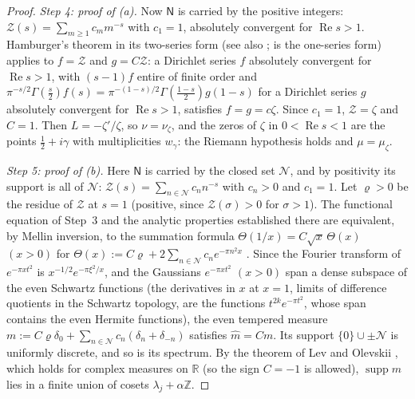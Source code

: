 \documentclass[11pt]{amsart}
\newcommand{\RR}{\mathbb R}
\newcommand{\ZZ}{\mathbb Z}
\renewcommand{\Re}{\operatorname{Re}}
\newcommand{\supp}{\operatorname{supp}}
\newcommand{\muz}{\mu_\zeta}
\newcommand{\nuz}{\nu_\zeta}
\theoremstyle{definition}
\theoremstyle{remark}
\numberwithin{equation}{section}
\begin{document}
\begin{proof}
\emph{Step 4: proof of (a).} Now $\mathsf N$ is carried by the positive integers: $\mathcal Z(s)=\sum_{m\ge1}c_mm^{-s}$ with $c_1=1$,
absolutely convergent for $\Re s>1$. Hamburger's theorem in its two-series form \cite[Satz~1]{Ham21} (see also \cite{Bur12};
\cite[Theorem~2.1]{Per17} is the one-series form) applies to $f=\mathcal Z$ and $g=C\mathcal Z$: a Dirichlet series $f$ absolutely
convergent for $\Re s>1$, with $(s-1)f$ entire of finite order and $\pi^{-s/2}\Gamma(\frac s2)f(s)=\pi^{-(1-s)/2}\Gamma(\frac{1-s}2)g(1-s)$ for
a Dirichlet series $g$ absolutely convergent for $\Re s>1$, satisfies $f=g=c\zeta$. Since $c_1=1$, $\mathcal Z=\zeta$ and $C=1$. Then
$L=-\zeta'/\zeta$, so $\nu=\nuz$, and the zeros of $\zeta$ in $0<\Re s<1$ are the points $\frac12+i\gamma$ with multiplicities
$w_\gamma$: the Riemann hypothesis holds and $\mu=\muz$.

\emph{Step 5: proof of (b).} Here $\mathsf N$ is carried by the closed set $\mathcal N$, and by positivity its support is all of
$\mathcal N$: $\mathcal Z(s)=\sum_{n\in\mathcal N}c_nn^{-s}$ with $c_n>0$ and $c_1=1$. Let $\varrho>0$ be the residue of $\mathcal Z$ at $s=1$
(positive, since $\mathcal Z(\sigma)>0$ for $\sigma>1$). The functional equation of Step~3 and the analytic properties established
there are equivalent, by Mellin inversion, to the summation formula $\Theta(1/x)=C\sqrt x\,\Theta(x)$ $(x>0)$ for
$\Theta(x):=C\varrho+2\sum_{n\in\mathcal N}c_ne^{-\pi n^2x}$ \cite[Introduction, Theorems~1--3 and Propositions~3--4]{KM58}.
Since the Fourier transform of $e^{-\pi xt^2}$ is $x^{-1/2}e^{-\pi\xi^2/x}$, and the Gaussians $e^{-\pi xt^2}$ $(x>0)$ span a dense
subspace of the even Schwartz functions (the derivatives in $x$ at $x=1$, limits of difference quotients in the Schwartz topology,
are the functions $t^{2k}e^{-\pi t^2}$, whose span contains the even Hermite functions), the even tempered measure $m:=C\varrho\delta_0+\sum_{n\in\mathcal N}c_n(\delta_n+\delta_{-n})$
satisfies $\widehat m=Cm$. Its support $\{0\}\cup\pm\mathcal N$ is uniformly discrete, and so is its spectrum. By the theorem of Lev
and Olevskii \cite[Theorem~1]{LO15}, which holds for complex measures on $\RR$ (so the sign $C=-1$ is allowed), $\supp m$ lies in a
finite union of cosets $\lambda_j+\alpha\ZZ$.


\end{proof}
\end{document}
